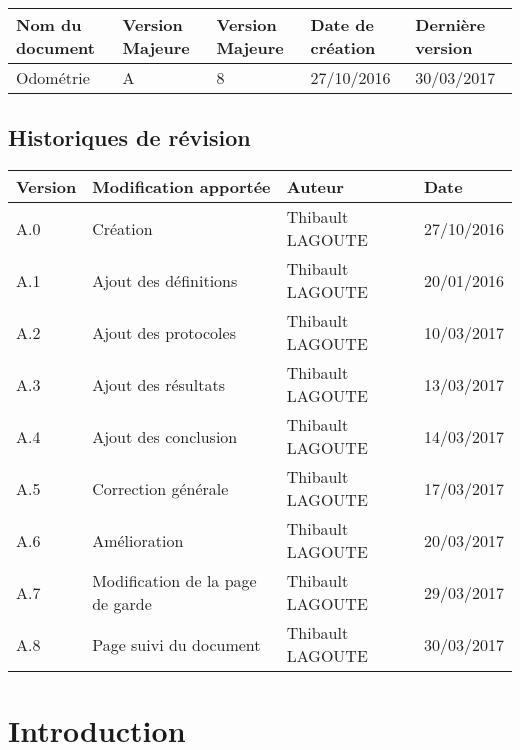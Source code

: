 \documentclass[10pt,a4paper]{article}
\begin{document}
\begin{center}
    \begin{tabular}{| l | l | l | l | l |}
    \hline
    \rowcolor{gray} Nom du document & Version Majeure & Version Majeure & Date de création & Dernière version \\ \hline
    Odométrie & A & 8 & 27/10/2016 & 30/03/2017 \\ \hline
    \end{tabular}
\end{center}


\subsection*{Historiques de révision}

\begin{center}
    \begin{tabular}{| l | l | l | l |}
    \hline
     \rowcolor{gray} Version & Modification apportée & Auteur & Date \\ \hline
    A.0 & Création & Thibault LAGOUTE & 27/10/2016\\ \hline
    A.1 & Ajout des définitions & Thibault LAGOUTE & 20/01/2016\\ \hline
    A.2 & Ajout des protocoles & Thibault LAGOUTE & 10/03/2017\\ \hline
    A.3 & Ajout des résultats & Thibault LAGOUTE & 13/03/2017\\ \hline
    A.4 & Ajout des conclusion & Thibault LAGOUTE & 14/03/2017\\ \hline
    A.5 & Correction générale & Thibault LAGOUTE & 17/03/2017\\ \hline
    A.6 & Amélioration & Thibault LAGOUTE & 20/03/2017\\ \hline
    A.7 & Modification de la page de garde & Thibault LAGOUTE & 29/03/2017\\ \hline
    A.8 & Page suivi du document & Thibault LAGOUTE & 30/03/2017\\ \hline
    \end{tabular}
\end{center}



\makeatletter
\def\captionof#1#2{{\def\@captype{#1}#2}}
\makeatother

\newpage
\section{Introduction}
\end{document}

